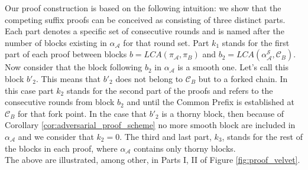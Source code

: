 Our proof construction is based on the following intuition: we show that the competing
suffix proofs can be conceived as consisting of three distinct parts. Each part denotes a specific set of consecutive rounds and is named after the number of blocks existing
in $\alpha_\mathcal{A}$ for that round set. Part $k_1$ stands for the first part of each proof
between blocks $b = LCA(\pi_\mathcal{A}, \pi_B)$ and $b_2 = LCA(\alpha^{\mathcal{S}}_\mathcal{A}, \mathcal{C}_B)$. Now consider that the block following $b_2$ in $\alpha_\mathcal{A}$ is a smooth one. Let's call this block $b'_2$. This means that $b'_2$ does not belong to $\mathcal{C}_B$ but to a forked chain. In this case part $k_2$ stands for the second part of the proofs and refers to the consecutive rounds from block $b_2$ and until
the Common Prefix is established at $\mathcal{C}_B$ for that fork point. In the case that $b'_2$ is a thorny block, then because of Corollary \ref{cor:adversarial_proof_scheme} no more smooth block are included in $\alpha_\mathcal{A}$ and we consider that $k_2 = 0$.
The third and last part, $k_3$, stands for the rest of the blocks in each proof, where $\alpha_\mathcal{A}$ contains only thorny blocks.\\
The above are illustrated, among other, in Parts I, II of Figure \ref{fig:proof_velvet}.

